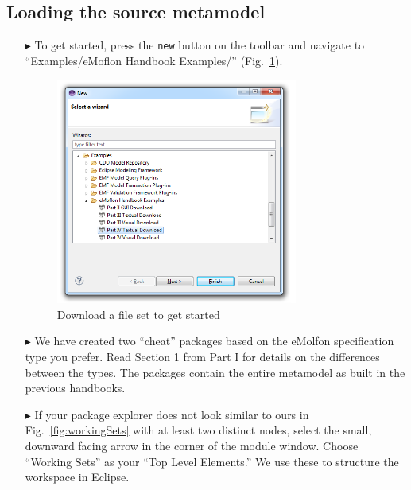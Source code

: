 \subsection{Loading the source metamodel}
\label{sec:loadSourceMeta}
\begin{itemize}

\item[$\blacktriangleright$] To get started, press the \texttt{new} button on the toolbar and navigate to ``Examples/eMoflon Handbook Examples/''
(Fig.~\ref{fig:downPartIV}).

\begin{figure}[htbp]
\begin{center}
  \includegraphics[width=0.75\textwidth]{eclipse_downloadWizardPartIV}
  \caption{Download a file set to get started}
  \label{fig:downPartIV}
\end{center}
\end{figure}

\clearpage

\item[$\blacktriangleright$] We have created two ``cheat'' packages based on the eMolfon specification type you prefer. Read Section 1 from Part I for details
on the differences between the types. The packages contain the entire metamodel as built in the previous handbooks.

\item[$\blacktriangleright$] If your package explorer does not look similar to ours in Fig.~\ref{fig:workingSets} with at least two distinct nodes, select the
small, downward facing arrow in the corner of the module window. Choose ``Working Sets'' as your ``Top Level Elements.'' We use these to structure the
workspace in Eclipse.


\end{itemize}
